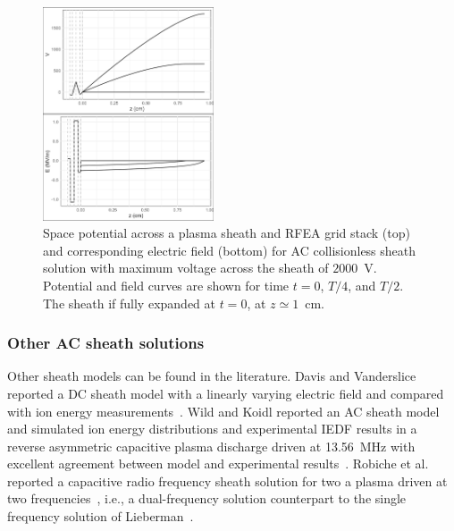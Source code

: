 \begin{figure}[htbp]
\centering
\includegraphics[width=0.45\textwidth]{Figures/VEz0.5Pa13.56MHz2kVStack2332.jpeg}
\caption{Space potential across a plasma sheath and RFEA grid stack (top) and corresponding electric field (bottom) for AC collisionless sheath solution with maximum voltage across the sheath of $2000$~V. Potential and field curves are shown for time $t=0$, $T/4$, and $T/2$. The sheath if fully expanded at $t=0$, at $z \simeq 1$~cm.}
\label{fig:ACpotentialField}
\end{figure}


\subsubsection{Other AC sheath solutions}

Other sheath models can be found in the literature. Davis and Vanderslice reported a DC sheath model with a linearly varying electric field and compared with ion energy measurements~\cite{Davis1963}. Wild and Koidl reported an AC sheath model and simulated ion energy distributions and experimental IEDF results in a reverse asymmetric capacitive plasma discharge driven at 13.56~MHz with excellent agreement between model and experimental results~\cite{Wild1991}. Robiche et al. reported a capacitive radio frequency sheath solution for two a plasma driven at two frequencies~\cite{Robiche2003}, i.e., a dual-frequency solution counterpart to the single frequency solution of Lieberman~\cite{Lieberman1988}.   







